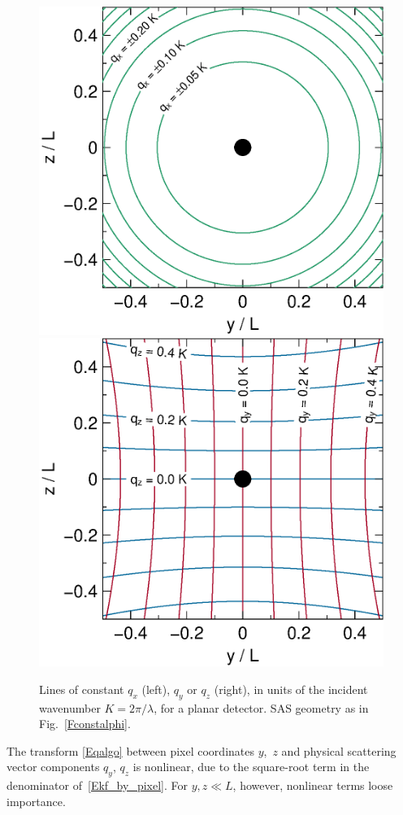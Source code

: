 \begin{figure}[t]
\begin{center}
\includegraphics[width=.47\textwidth]{fig/drawing/SAS_const_q_x.ps}
\hfill
\includegraphics[width=.47\textwidth]{fig/drawing/SAS_const_q_yz.ps}
\end{center}
\caption{Lines of constant $q_x$ (left), $q_y$ or $q_z$ (right),
in units of the incident wavenumber $K=2\pi/\lambda$,
for a planar detector.
SAS geometry as in Fig.~\protect\ref{Fconstalphi}.}
\label{Fconstq}
\end{figure}

The transform \cref{Eqalgo} between pixel coordinates $y$,~$z$
and physical scattering vector components $q_y$, $q_z$
is nonlinear, due to the square-root term in the denominator of~\cref{Ekf_by_pixel}.
For $y,z\ll L$, however, nonlinear terms loose importance.

